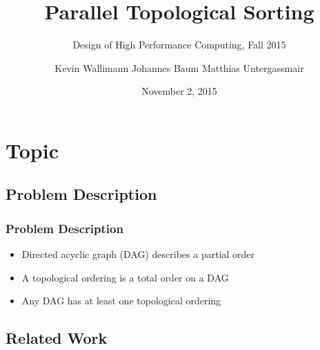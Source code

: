 

\author[]{Kevin Wallimann \quad Johannes Baum \quad Matthias Untergassmair}


\title[Topological Sorting]{Parallel Topological Sorting} %
\subtitle{Design of High Performance Computing, Fall 2015}

\date{November 2, 2015}


\begin{frame}
\titlepage %
\end{frame}


\section{Topic}

\subsection{Problem Description}

\begin{frame}
\frametitle{Problem Description}

\begin{itemize}
	\item Directed acyclic graph (DAG) describes a partial order
	\item A topological ordering is a total order on a DAG
	\item Any DAG has at least one topological ordering
\end{itemize}

\end{frame}




\subsection{Related Work}

